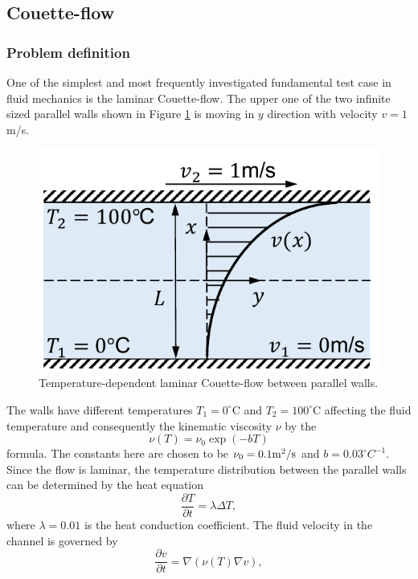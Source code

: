 \documentclass[a4paper,12pt,openany]{book}
\theoremstyle{break}
\begin{document}
\subsection{Couette-flow}
\subsubsection{Problem definition}
One of the simplest and most frequently investigated fundamental test case in fluid mechanics is the laminar Couette-flow. The upper one of the two infinite sized parallel walls shown in Figure \ref{fig:couette} is moving in $y$ direction with velocity $v=1$m/s.
\begin{figure}[h!]
  \includegraphics[scale=0.7]{couette.pdf}
  \centering
  \caption{Temperature-dependent laminar Couette-flow between parallel walls.}
  \label{fig:couette}
\end{figure}\vspace*{3pt}
The walls have different temperatures $T_1=0^\circ$C and $T_2=100^\circ$C affecting the fluid temperature and consequently the kinematic viscosity $\nu$ by the
\begin{equation}
\nu(T)=\nu_0 \exp(-bT)
\end{equation}
formula. The constants here are chosen to be $\nu_0=0.1\rm{m}^2/\rm s$ and $b=0.03 ^\circ C^{-1}$. Since the flow is laminar, the temperature distribution between the parallel walls can be determined by the heat equation
\begin{equation} \label{eq:couette_laplace}
\frac{\partial T}{\partial t}=\lambda\Delta T,
\end{equation}
where $\lambda=0.01$ is the heat conduction coefficient. The fluid velocity in the channel is governed by 
\begin{equation} \label{eq:couette_eom}
\frac{\partial v}{\partial t}=\nabla(\nu(T)\nabla v),
\end{equation}
\end{document}
